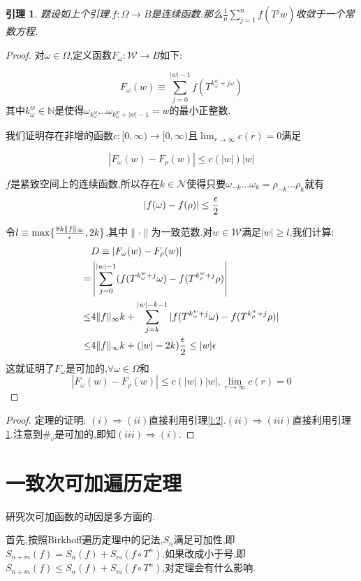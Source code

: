 \documentclass[a4paper,11pt,oneside]{book}
\newtheorem{lemma}{\textbf{\hspace{0.7cm}引理}}[section]
\begin{document}
\begin{lemma}
\label{l:3}
题设如上个引理.$f:\Omega\rightarrow B$是连续函数.那么$\frac{1}{n}\sum_{j=1}^nf(T^jw)$收敛于一个常数方程.
\end{lemma}
\newcommand{\w}{\omega}
\begin{proof}
对$\w\in\Omega$,定义函数$F_\w:\mathcal{W}\rightarrow B$如下:

$$F_\w(w)\equiv \sum_{j=0}^{|w|-1}f(T^{k_\w^w+j\w})$$
其中$k_\w^w\in \mathbb{N}$是使得$\w_{k_\w^w}\ldots\w_{k_\w^w+|w|-1}=w$的最小正整数.

我们证明存在非增的函数$c:[0,\infty)\rightarrow[0,\infty)$且$\lim_{r\to \infty}c(r)=0$满足

$$|F_\w(w)-F_\rho(w)|\leq c(|w|)|w|$$

$f$是紧致空间上的连续函数,所以存在$k\in\mathcal{N}$使得只要$\w_{-k}\ldots\w_k=\rho_{-k}\ldots\rho_k$就有$$|f(\w)-f(\rho)|\leq {\epsilon\over 2}$$

令$l\equiv \max\{{8k\|f\|_\infty \over \epsilon},2k\}$,其中$\|\cdot\|$为一致范数.对$w\in\mathcal{W}$满足$|w|\geq l$,我们计算:
\begin{align*}
&D\equiv|F_\w(w)-F_\rho(w)|\\
=&\left|\sum_{j=0}^{|w|-1}(f(T^{k_\w^w+j}\w)-f(T^{k_\rho^w+j}\rho)\right|\\
\leq &4\|f\|_\infty k+\sum_{j=k}^{|w|-k-1}|f(T^{k_\w^w+j}\w)-f(T^{k_\rho^w+j}\rho)|\\
\leq & 4\|f\|_\infty k+(|w|-2k){\epsilon\over 2}\leq |w|\epsilon
\end{align*}
这就证明了$F_\w$是可加的,$\forall \w\in\Omega$和$$|F_\w(w)-F_\rho(w)|\leq c(|w|)|w|,\lim_{r\to \infty}c(r)=0$$
\end{proof}

\begin{proof}
定理的证明:
$(i)\Rightarrow(ii)$直接利用引理\ref{l:2}.$(ii)\Rightarrow(iii)$直接利用引理\ref{l:3}.注意到$\#_v$是可加的,即知$(iii)\Rightarrow (i)$.
\end{proof}


\section{一致次可加遍历定理}
研究次可加函数的动因是多方面的.


首先,按照Birkhoff遍历定理中的记法,$S_n$满足可加性,即$S_{n+m}(f)=S_n(f)+S_m(f\circ T^n)$.如果改成小于号,即$S_{n+m}(f)\leq S_n(f)+S_m(f\circ T^n)$,对定理会有什么影响.
\end{document}
